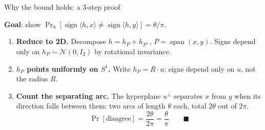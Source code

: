 \documentclass[aspectratio=169,12pt]{beamer}
\begin{document}
\begin{frame}{Why the bound holds: a 3-step proof}

\textbf{Goal}: show $\Pr_h[\operatorname{sign}\langle h,x\rangle \neq \operatorname{sign}\langle h,y\rangle] = \theta/\pi$.

\vspace{4pt}
\begin{enumerate}\setlength\itemsep{2pt}
\item<1-> \textbf{Reduce to 2D.}
  Decompose $h = h_P + h_{P^\perp}$, $P = \operatorname{span}(x,y)$.
  Signs depend only on $h_P \sim \mathcal{N}(0,I_2)$ by rotational invariance.

\item<2-> \textbf{$h_P$ points uniformly on $S^1$.}
  Write $h_P = R\cdot u$; signs depend only on $u$, not the radius $R$.

\item<3-> \textbf{Count the separating arc.}
  The hyperplane $u^\perp$ separates $x$ from $y$ when its direction falls between
  them: two arcs of length $\theta$ each, total $2\theta$ out of $2\pi$.
  \[
    \Pr[\text{disagree}] = \frac{2\theta}{2\pi} = \frac{\theta}{\pi} \qquad \blacksquare
  \]
\end{enumerate}

\end{frame}
\end{document}
